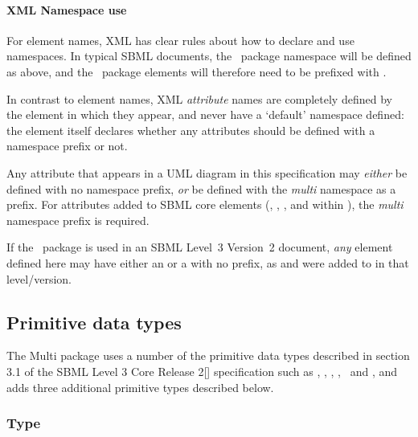 
\mBlockChangedBegin{\revTwentyTwentyMarch}
\paragraph{XML Namespace use} \label{def:xml_namespace_use}

For element names, XML has clear rules about how to declare and use namespaces.  In typical SBML documents, the \multi\ package namespace will be defined as above, and the \multi\ package elements will therefore need to be prefixed with .

In contrast to element names, XML \emph{attribute} names are completely defined by the element in which they appear, and never have a `default' namespace defined:  the element itself declares whether any attributes should be defined with a namespace prefix or not.  

Any attribute that appears in a UML diagram in this specification may \emph{either} be defined with no namespace prefix, \emph{or} be defined with the \emph{multi} namespace as a prefix.  For attributes added to SBML core elements (\Compartment, \Species, \SimpleSpeciesReference, and within \textbf{}\xspace), the \emph{multi} namespace prefix is required.

If the \multi\ package is used in an SBML Level~3 Version~2 document, \emph{any} element defined here may have either an  or a  with no prefix, as  and  were added to \SBase in that level/version.   
\mBlockChangedEnd{\revTwentyTwentyMarch}


\subsection{Primitive data types}
\label{def:Primitive_data_types}

The Multi package uses a number of the primitive data types described in \mBlockChangedBegin{\revTwentyTwentyMarch}section 3.1\mBlockChangedEnd{\revTwentyTwentyMarch} of the SBML Level 3 Core Release 2[\cite{ref:sbmll3v1}] specification such as \SIdPT, \SIdRefPT, \stringPT, \booleanPT, \intPT\ and \positiveIntegerPT, and adds three additional primitive types described below.

\subsubsection{Type \BindingStatusPT}
\label{def:Primtype:BindingStatus}


